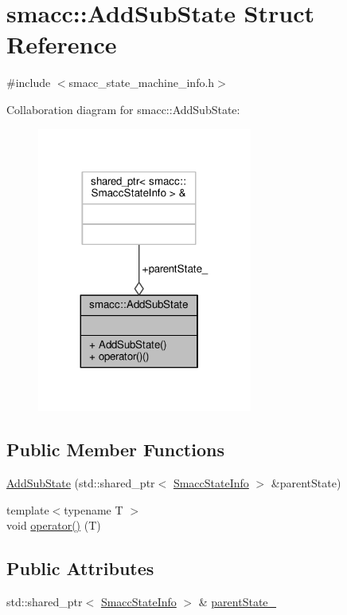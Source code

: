 \hypertarget{structsmacc_1_1AddSubState}{}\section{smacc\+:\+:Add\+Sub\+State Struct Reference}
\label{structsmacc_1_1AddSubState}


{\ttfamily \#include $<$smacc\+\_\+state\+\_\+machine\+\_\+info.\+h$>$}



Collaboration diagram for smacc\+:\+:Add\+Sub\+State\+:
\nopagebreak
\begin{figure}[H]
\begin{center}
\leavevmode
\includegraphics[width=200pt]{structsmacc_1_1AddSubState__coll__graph}
\end{center}
\end{figure}
\subsection*{Public Member Functions}
\begin{DoxyCompactItemize}
\item 
\hyperlink{structsmacc_1_1AddSubState_a2110c7ebd1833484f328bed15e1a988c}{Add\+Sub\+State} (std\+::shared\+\_\+ptr$<$ \hyperlink{classsmacc_1_1SmaccStateInfo}{Smacc\+State\+Info} $>$ \&parent\+State)
\item 
{\footnotesize template$<$typename T $>$ }\\void \hyperlink{structsmacc_1_1AddSubState_a24b6d9a40ca08289e36562d26f1b863c}{operator()} (T)
\end{DoxyCompactItemize}
\subsection*{Public Attributes}
\begin{DoxyCompactItemize}
\item 
std\+::shared\+\_\+ptr$<$ \hyperlink{classsmacc_1_1SmaccStateInfo}{Smacc\+State\+Info} $>$ \& \hyperlink{structsmacc_1_1AddSubState_a24aaa4e3dbe9722ce100f24b73207cd6}{parent\+State\+\_\+}
\end{DoxyCompactItemize}


